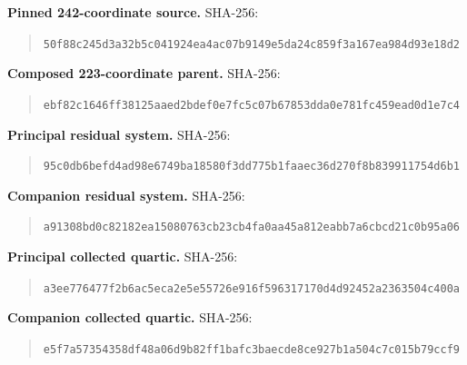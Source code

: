 \par\smallskip\noindent\begin{minipage}{\linewidth}
\textbf{Pinned 242-coordinate source.} SHA-256:
\begin{quote}\small\ttfamily
\nolinkurl{50f88c245d3a32b5c041924ea4ac07b9149e5da24c859f3a167ea984d93e18d2}
\end{quote}
\end{minipage}\par
\par\smallskip\noindent\begin{minipage}{\linewidth}
\textbf{Composed 223-coordinate parent.} SHA-256:
\begin{quote}\small\ttfamily
\nolinkurl{ebf82c1646ff38125aaed2bdef0e7fc5c07b67853dda0e781fc459ead0d1e7c4}
\end{quote}
\end{minipage}\par
\par\smallskip\noindent\begin{minipage}{\linewidth}
\textbf{Principal residual system.} SHA-256:
\begin{quote}\small\ttfamily
\nolinkurl{95c0db6befd4ad98e6749ba18580f3dd775b1faaec36d270f8b839911754d6b1}
\end{quote}
\end{minipage}\par
\par\smallskip\noindent\begin{minipage}{\linewidth}
\textbf{Companion residual system.} SHA-256:
\begin{quote}\small\ttfamily
\nolinkurl{a91308bd0c82182ea15080763cb23cb4fa0aa45a812eabb7a6cbcd21c0b95a06}
\end{quote}
\end{minipage}\par
\par\smallskip\noindent\begin{minipage}{\linewidth}
\textbf{Principal collected quartic.} SHA-256:
\begin{quote}\small\ttfamily
\nolinkurl{a3ee776477f2b6ac5eca2e5e55726e916f596317170d4d92452a2363504c400a}
\end{quote}
\end{minipage}\par
\par\smallskip\noindent\begin{minipage}{\linewidth}
\textbf{Companion collected quartic.} SHA-256:
\begin{quote}\small\ttfamily
\nolinkurl{e5f7a57354358df48a06d9b82ff1bafc3baecde8ce927b1a504c7c015b79ccf9}
\end{quote}
\end{minipage}\par
